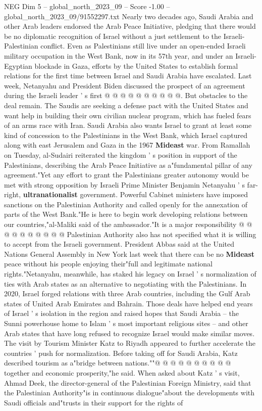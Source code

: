 \begin{textsample}{NEG Dim 5 – global\_north\_2023\_09 – Score -1.00 – global\_north\_2023\_09/91552297.txt}
Nearly two decades ago, Saudi Arabia and other Arab leaders endorsed the Arab Peace Initiative, pledging that there would be no diplomatic recognition of Israel without a just settlement to the Israeli-Palestinian conflict.
Even as Palestinians still live under an open-ended Israeli military occupation in the West Bank, now in its 57th year, and under an Israeli-Egyptian blockade in Gaza, efforts by the United States to establish formal relations for the first time between Israel and Saudi Arabia have escalated.
Last week, Netanyahu and President Biden discussed the prospect of an agreement during the Israeli leader ' s first @ @ @ @ @ @ @ @ @ @.
But obstacles to the deal remain.
The Saudis are seeking a defense pact with the United States and want help in building their own civilian nuclear program, which has fueled fears of an arms race with Iran.
Saudi Arabia also wants Israel to grant at least some kind of concession to the Palestinians in the West Bank, which Israel captured along with east Jerusalem and Gaza in the 1967 \textbf{Mideast} war.
From Ramallah on Tuesday, al-Sudairi reiterated the kingdom ' s position in support of the Palestinians, describing the Arab Peace Initiative as a"fundamental pillar of any agreement."Yet any effort to grant the Palestinians greater autonomy would be met with strong opposition by Israeli Prime Minister Benjamin Netanyahu ' s far-right, \textbf{ultranationalist} government.
Powerful Cabinet ministers have imposed sanctions on the Palestinian Authority and called openly for the annexation of parts of the West Bank."He is here to begin work developing relations between our countries,"al-Maliki said of the ambassador."It is a major responsibility @ @ @ @ @ @ @ @ @ @ Palestinian Authority also has not specified what it is willing to accept from the Israeli government.
President Abbas said at the United Nations General Assembly in New York last week that there can be no \textbf{Mideast} peace without his people enjoying their"full and legitimate national rights."Netanyahu, meanwhile, has staked his legacy on Israel ' s normalization of ties with Arab states as an alternative to negotiating with the Palestinians.
In 2020, Israel forged relations with three Arab countries, including the Gulf Arab states of United Arab Emirates and Bahrain.
Those deals have helped end years of Israel ' s isolation in the region and raised hopes that Saudi Arabia -- the Sunni powerhouse home to Islam ' s most important religious sites -- and other Arab states that have long refused to recognize Israel would make similar moves.
The visit by Tourism Minister Katz to Riyadh appeared to further accelerate the countries ' push for normalization.
Before taking off for Saudi Arabia, Katz described tourism as a"bridge between nations.""@ @ @ @ @ @ @ @ @ @ together and economic prosperity,"he said.
When asked about Katz ' s visit, Ahmad Deek, the director-general of the Palestinian Foreign Ministry, said that the Palestinian Authority"is in continuous dialogue"about the developments with Saudi officials and"trusts in their support for the rights of

\end{textsample}
